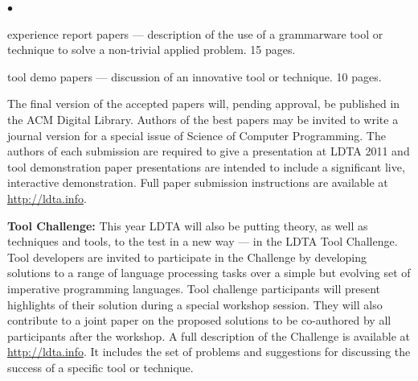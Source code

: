 \documentclass[10pt,A4paper]{article}
\newenvironment{inditemlist}{
                         \begin{list}{{$\bullet$}} 
                         {\setlength{\itemsep}{0pt} 
                         \setlength{\topsep}{0pt} 
                         \setlength{\partopsep}{2pt}
                         \setlength{\leftmargin}{12pt} 
                         \setlength{\labelwidth}{8pt} 
                         \setlength{\labelsep}{2pt} 
                         \setlength{\listparindent}{0pt}
                         \setlength{\parsep}{0.07cm}
                         \usecounter{enumi} 
                         \setlength{\parskip}{0.2cm}}}{\end{list}\vspace{2mm} }
\begin{document}
\begin{minipage}[t]{5.1in}
\begin{inditemlist}
\item experience report papers --- description of the use of a grammarware
  tool or technique to solve a non-trivial applied problem. 15 pages.

\item tool demo papers --- discussion of an innovative tool or technique.
  10 pages.
\end{inditemlist}
The final version of the accepted papers will,
pending approval, be published in the ACM Digital Library.  Authors of
the best papers may be invited to write a journal version for a
special issue of Science of Computer Programming.
%
The authors of each submission are required to give a presentation at
LDTA 2011 and tool demonstration paper presentations are intended to
include a significant live, interactive demonstration.
%
Full paper submission instructions are available at \url{http://ldta.info}.

\medskip
\textbf{Tool Challenge:}
This year LDTA will also be putting theory, as well as techniques and
tools, to the test in a new way --- in the LDTA Tool Challenge.  Tool
developers are invited to participate in the Challenge by developing
solutions to a range of language processing tasks over a simple but
evolving set of imperative programming languages.  Tool challenge
participants will present highlights of their solution during a
special workshop session.  They will also contribute to a joint paper on the
 proposed solutions to be co-authored by all
participants after the workshop.  
%
A full description of the Challenge is available at
\url{http://ldta.info}.  It includes the set of
problems and suggestions for discussing the success of a specific
tool or technique.






\end{minipage}
\end{document}
